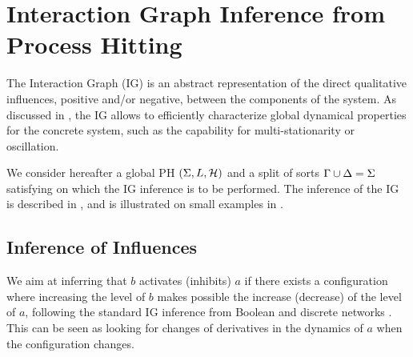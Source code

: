 \section{Interaction Graph Inference from Process Hitting}\label{sec:infer-IG}

The Interaction Graph (IG) is an abstract representation of the direct qualitative influences,
positive and/or negative, between the components of the system.
As discussed in , the IG allows to efficiently characterize global dynamical
properties for the concrete system, such as the capability for multi-stationarity or oscillation.



We consider hereafter a global PH $(\Sigma,L,\mathcal{H})$ and a split of sorts
$\Gamma \cup \Delta=\Sigma$ satisfying  on which the IG inference is to be
performed.
The inference of the IG is described in , and is illustrated
on small examples in .


\subsection{Inference of Influences}\label{ssec:infer-IG}

\def\fp{\Phi}

We aim at inferring that $b$ activates (inhibits) $a$ if there exists a configuration where increasing
the level of $b$ makes possible the increase (decrease) of the level of $a$,
following the standard IG inference from Boolean and discrete networks \cite{Richard2010378}.
This can be seen as looking for changes of derivatives in the dynamics of $a$
when the configuration changes.

